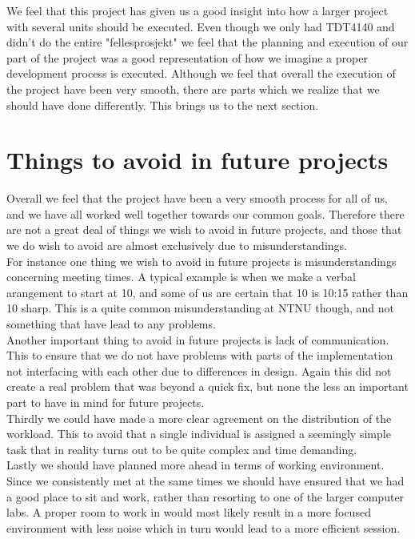 We feel that this project has given us a good insight into how a larger project with several units should be executed. Even though we only had TDT4140 and didn't do the entire "fellesprosjekt" we feel that the planning and execution of our part of the project was a good representation of how we imagine a proper development process is executed. Although we feel that overall the execution of the project have been very smooth, there are parts which we realize that we should have done differently. This brings us to the next section.

\section{Things to avoid in future projects}
Overall we feel that the project have been a very smooth process for all of us, and we have all worked well together towards our common goals. Therefore there are not a great deal of things we wish to avoid in future projects, and those that we do wish to avoid are almost exclusively due to misunderstandings. \\
For instance one thing we wish to avoid in future projects is misunderstandings concerning meeting times. A typical example is when we make a verbal arangement to start at 10, and some of us are certain that 10 is 10:15 rather than 10 sharp. This is a quite common misunderstanding at NTNU though, and not something that have lead to any problems. \\
Another important thing to avoid in future projects is lack of communication. This to ensure that we do not have problems with parts of the implementation not interfacing with each other due to differences in design. Again this did not create a real problem that was beyond a quick fix, but none the less an important part to have in mind for future projects. \\
Thirdly we could have made a more clear agreement on the distribution of the workload. This to avoid that a single individual is assigned a seemingly simple task that in reality turns out to be quite complex and time demanding. \\
Lastly we should have planned more ahead in terms of working environment. Since we consistently met at the same times we should have ensured that we had a good place to sit and work, rather than resorting to one of the larger computer labs. A proper room to work in would most likely result in a more focused environment with less noise which in turn would lead to a more efficient session.

